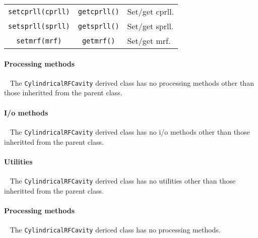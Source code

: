 \begin{table}[h]
\begin{center}
\begin{tabular}{|c|c|p{5cm}|}
      \texttt{setcprll(cprll)}              & \texttt{getcprll()}             & Set/get cprll.                     \\
      \texttt{setsprll(sprll)}              & \texttt{getsprll()}             & Set/get sprll.                     \\
      \texttt{setmrf(mrf)}                  & \texttt{getmrf()}              & Set/get mrf.                     \\
      \hline
    \end{tabular}
  \end{center}
\end{table}

\paragraph{Processing methods} ~\newline
\noindent
The \texttt{CylindricalRFCavity} derived class has no processing
methods other than those inheritted from the parent class.

\paragraph{I/o methods} ~\newline
\noindent
The \texttt{CylindricalRFCavity} derived class has no i/o methods other
than those inheritted from the parent class.

\paragraph{Utilities} ~\newline
\noindent
The \texttt{CylindricalRFCavity} derived class has no utilities other
than those inheritted from the parent class. 

\paragraph{Processing methods} ~\newline
\noindent
The \texttt{CylindricalRFCavity} dericed class has no processing methods.

\FloatBarrier

